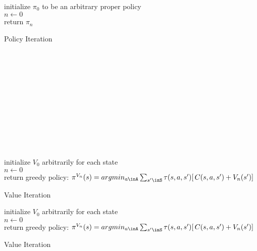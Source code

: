 \LinesNumbered
\begin{algorithm}[H]
\SetAlgoLined
initialize $\pi_0$ to be an arbitrary proper policy \\
$n \xleftarrow{} 0$ \\
return $\pi_n$
\caption{Policy Iteration}
\end{algorithm}


\\
\\
\\
\\
\\
\\
\\
\\
\\
\\


\LinesNumbered
\begin{algorithm}[H]
\SetAlgoLined
initialize $V_0$ arbitrarily for each state \\
$n \xleftarrow{} 0$ \\ 
return greedy policy: $\pi^{V_n} (s) = argmin_{a\inA} \sum_{s'\inS} \tau(s, a, s')[ \,C(s, a, s') + V_n (s')] \,$
\caption{Value Iteration}
\end{algorithm}


\LinesNumbered
\begin{algorithm}[H]
\SetAlgoLined
initialize $V_0$ arbitrarily for each state \\
$n \xleftarrow{} 0$ \\
return greedy policy: $\pi^{V_n} (s) = argmin_{a\inA} \sum_{s'\inS} \tau(s, a, s')[ \,C(s, a, s') + V_n (s')] \,$
\caption{Value Iteration}
\end{algorithm}



